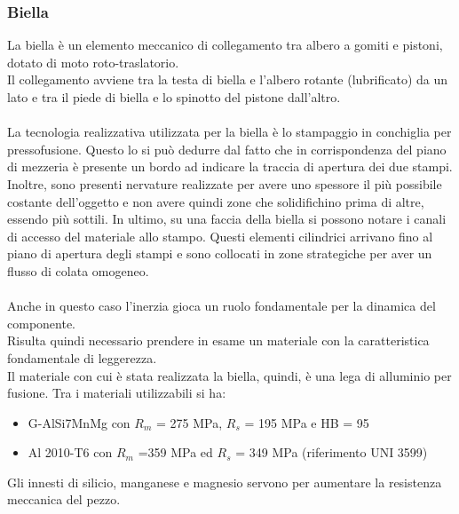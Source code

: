 \subsubsection{Biella}
La biella è un elemento meccanico di collegamento tra albero a gomiti e pistoni, dotato di moto roto-traslatorio.\\
Il collegamento avviene tra la testa di biella e l’albero rotante (lubrificato) da un lato e tra il piede di biella e lo spinotto del pistone dall’altro. \\
\\
La tecnologia realizzativa utilizzata per la biella è lo stampaggio in conchiglia per pressofusione. 
Questo lo si può dedurre dal fatto che in corrispondenza del piano di mezzeria è presente un bordo ad indicare la traccia di apertura dei due stampi. 
Inoltre, sono presenti nervature realizzate per avere uno spessore il più possibile costante dell’oggetto e non avere quindi zone che solidifichino prima di altre, essendo più sottili. 
In ultimo, su una faccia della biella si possono notare i canali di accesso del materiale allo stampo. Questi elementi cilindrici arrivano fino al piano di apertura degli stampi e sono collocati in zone strategiche per aver un flusso di colata omogeneo.\\
\\
Anche in questo caso l’inerzia gioca un ruolo fondamentale per la dinamica del componente. \\
Risulta quindi necessario prendere in esame un materiale con la caratteristica fondamentale di leggerezza. \\
Il materiale con cui è stata realizzata la biella, quindi, è una lega di alluminio per fusione. Tra i materiali utilizzabili si ha:
\begin{itemize}
    \item G-AlSi7MnMg con $R_m$ = 275 MPa, $R_s$ = 195 MPa e HB = 95
    \item Al 2010-T6 con $R_m$ =359 MPa ed $R_s$ = 349 MPa
(riferimento UNI 3599)
\end{itemize}
Gli innesti di silicio, manganese e magnesio servono per aumentare la resistenza meccanica del pezzo.\\
